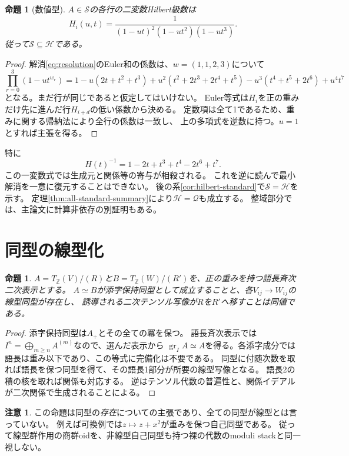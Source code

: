 \documentclass[11pt,a4paper]{ltjsarticle}
\newtheorem{proposition}[theorem]{命題}
\theoremstyle{definition}
\newtheorem{remark}[theorem]{注意}
\newcommand{\ZZ}{\mathbb Z}
\newcommand{\gr}{\operatorname{gr}}
\begin{document}
\begin{proposition}[数値型]\label{prop:hilbert}
$A\in\mathcal S$の各行の二変数Hilbert級数は
\[
H_i(u,t)=\frac{1}{(1-ut)^2(1-ut^2)(1-ut^3)}.
\]
従って$\mathcal S\subseteq\mathcal H$である。
\end{proposition}
\begin{proof}
解消\eqref{eq:resolution}のEuler和の係数は、$w=(1,1,2,3)$について
\[
\prod_{r=0}^3(1-ut^{w_r})
=1-u(2t+t^2+t^3)+u^2(t^2+2t^3+2t^4+t^5)
-u^3(t^4+t^5+2t^6)+u^4t^7
\]
となる。まだ行が同じであると仮定してはいけない。
Euler等式は$H_i$を正の重みだけ先に進んだ行$H_{i+d}$の低い係数から決める。
定数項は全て1であるため、重みに関する帰納法により全行の係数は一致し、
上の多項式を逆数に持つ。$u=1$とすれば主張を得る。
\end{proof}
特に
\[
H(t)^{-1}=1-2t+t^3+t^4-2t^6+t^7.
\]
この一変数式では生成元と関係等の寄与が相殺される。
これを逆に読んで最小解消を一意に復元することはできない。
後の系\ref{cor:hilbert-standard}で$\mathcal S=\mathcal H$を示す。
定理\ref{thm:all-standard-summary}により$\mathcal H=\mathcal Q$も成立する。
整域部分では、主論文に計算非依存の別証明もある。

\section{同型の線型化}
\begin{proposition}\label{prop:linearization}
$A=T_{\ZZ}(V)/(R)$と$B=T_{\ZZ}(W)/(R')$を、正の重みを持つ語長斉次二次表示とする。
$A\simeq B$が添字保持同型として成立することと、各$V_{ij}\to W_{ij}$の線型同型が存在し、
誘導される二次テンソル写像が$R$を$R'$へ移すことは同値である。
\end{proposition}
\begin{proof}
添字保持同型は$A_+$とその全ての冪を保つ。
語長斉次表示では$I^n=\bigoplus_{m\geq n}A^{(m)}$なので、選んだ表示から
$\gr_I A\simeq A$を得る。各添字成分では語長は重み以下であり、この等式に完備化は不要である。
同型に付随次数を取れば語長を保つ同型を得て、その語長1部分が所要の線型写像となる。
語長2の積の核を取れば関係も対応する。
逆はテンソル代数の普遍性と、関係イデアルが二次関係で生成されることによる。
\end{proof}

\begin{remark}
この命題は同型の\emph{存在}についての主張であり、全ての同型が線型とは言っていない。
例えば可換例では$z\mapsto z+x^2$が重みを保つ自己同型である。
従って線型群作用の商群oidを、非線型自己同型も持つ裸の代数のmoduli stackと同一視しない。
\end{remark}
\end{document}
